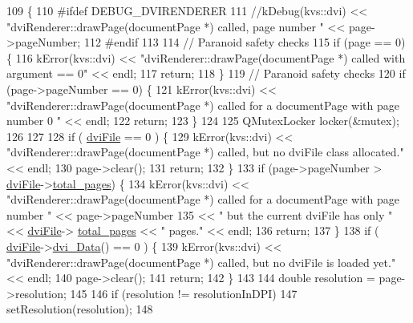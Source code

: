 \begin{DoxyCode}
109 \{
110 \textcolor{preprocessor}{#ifdef DEBUG\_DVIRENDERER}
111   \textcolor{comment}{//kDebug(kvs::dvi) << "dviRenderer::drawPage(documentPage *) called, page number " << page->pageNumber;}
112 \textcolor{preprocessor}{#endif}
113 
114   \textcolor{comment}{// Paranoid safety checks}
115   \textcolor{keywordflow}{if} (page == 0) \{
116     kError(kvs::dvi) << \textcolor{stringliteral}{"dviRenderer::drawPage(documentPage *) called with argument == 0"} << endl;
117     \textcolor{keywordflow}{return};
118   \}
119   \textcolor{comment}{// Paranoid safety checks}
120   \textcolor{keywordflow}{if} (page->pageNumber == 0) \{
121     kError(kvs::dvi) << \textcolor{stringliteral}{"dviRenderer::drawPage(documentPage *) called for a documentPage with page number 0
      "} << endl;
122     \textcolor{keywordflow}{return};
123   \}
124 
125   QMutexLocker locker(&mutex);
126 
127 
128   \textcolor{keywordflow}{if} ( \hyperlink{classdviRenderer_a67ded13a1a8da343aa0ee921ed96d4c2}{dviFile} == 0 ) \{
129     kError(kvs::dvi) << \textcolor{stringliteral}{"dviRenderer::drawPage(documentPage *) called, but no dviFile class allocated."} << 
      endl;
130     page->clear();
131     \textcolor{keywordflow}{return};
132   \}
133   \textcolor{keywordflow}{if} (page->pageNumber > \hyperlink{classdviRenderer_a67ded13a1a8da343aa0ee921ed96d4c2}{dviFile}->\hyperlink{classdvifile_a71577dbd82a462b855abc96be3b369c5}{total\_pages}) \{
134     kError(kvs::dvi) << \textcolor{stringliteral}{"dviRenderer::drawPage(documentPage *) called for a documentPage with page number "}
       << page->pageNumber
135                   << \textcolor{stringliteral}{" but the current dviFile has only "} << \hyperlink{classdviRenderer_a67ded13a1a8da343aa0ee921ed96d4c2}{dviFile}->
      \hyperlink{classdvifile_a71577dbd82a462b855abc96be3b369c5}{total\_pages} << \textcolor{stringliteral}{" pages."} << endl;
136     \textcolor{keywordflow}{return};
137   \}
138   \textcolor{keywordflow}{if} ( \hyperlink{classdviRenderer_a67ded13a1a8da343aa0ee921ed96d4c2}{dviFile}->\hyperlink{classdvifile_a81f1d32c52377a7b1802072eb40998b7}{dvi\_Data}() == 0 ) \{
139     kError(kvs::dvi) << \textcolor{stringliteral}{"dviRenderer::drawPage(documentPage *) called, but no dviFile is loaded yet."} << 
      endl;
140     page->clear();
141     \textcolor{keywordflow}{return};
142   \}
143 
144   \textcolor{keywordtype}{double} resolution = page->resolution;
145 
146   \textcolor{keywordflow}{if} (resolution != resolutionInDPI)
147     setResolution(resolution);
148  

\end{DoxyCode}
